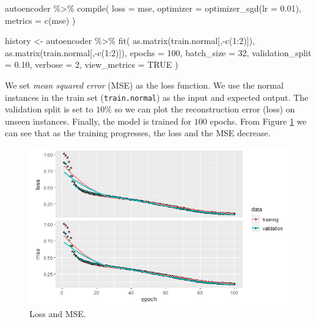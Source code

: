 \documentclass[
  11pt,
]{krantz}
\newenvironment{Shaded}{\begin{snugshade}}{\end{snugshade}}
\newcommand{\AttributeTok}[1]{\textcolor[rgb]{0.61,0.61,0.61}{#1}}
\newcommand{\ConstantTok}[1]{\textcolor[rgb]{0,0,0}{#1}}
\newcommand{\DecValTok}[1]{\textcolor[rgb]{0.06,0.06,0.06}{#1}}
\newcommand{\FloatTok}[1]{\textcolor[rgb]{0.06,0.06,0.06}{#1}}
\newcommand{\FunctionTok}[1]{\textcolor[rgb]{0,0,0}{#1}}
\newcommand{\NormalTok}[1]{#1}
\newcommand{\OtherTok}[1]{\textcolor[rgb]{0.37,0.37,0.37}{#1}}
\newcommand{\SpecialCharTok}[1]{\textcolor[rgb]{0,0,0}{#1}}
\newcommand{\StringTok}[1]{\textcolor[rgb]{0.5,0.5,0.5}{#1}}
\begin{document}
\begin{Shaded}
\begin{Highlighting}[]
\NormalTok{autoencoder }\SpecialCharTok{\%\textgreater{}\%} \FunctionTok{compile}\NormalTok{(}
  \AttributeTok{loss =} \StringTok{\textquotesingle{}mse\textquotesingle{}}\NormalTok{,}
  \AttributeTok{optimizer =} \FunctionTok{optimizer\_sgd}\NormalTok{(}\AttributeTok{lr =} \FloatTok{0.01}\NormalTok{),}
  \AttributeTok{metrics =} \FunctionTok{c}\NormalTok{(}\StringTok{\textquotesingle{}mse\textquotesingle{}}\NormalTok{)}
\NormalTok{)}

\NormalTok{history }\OtherTok{\textless{}{-}}\NormalTok{ autoencoder }\SpecialCharTok{\%\textgreater{}\%} \FunctionTok{fit}\NormalTok{(}
  \FunctionTok{as.matrix}\NormalTok{(train.normal[,}\SpecialCharTok{{-}}\FunctionTok{c}\NormalTok{(}\DecValTok{1}\SpecialCharTok{:}\DecValTok{2}\NormalTok{)]),}
  \FunctionTok{as.matrix}\NormalTok{(train.normal[,}\SpecialCharTok{{-}}\FunctionTok{c}\NormalTok{(}\DecValTok{1}\SpecialCharTok{:}\DecValTok{2}\NormalTok{)]),}
  \AttributeTok{epochs =} \DecValTok{100}\NormalTok{,}
  \AttributeTok{batch\_size =} \DecValTok{32}\NormalTok{,}
  \AttributeTok{validation\_split =} \FloatTok{0.10}\NormalTok{,}
  \AttributeTok{verbose =} \DecValTok{2}\NormalTok{,}
  \AttributeTok{view\_metrics =} \ConstantTok{TRUE}
\NormalTok{)}
\end{Highlighting}
\end{Shaded}

We set \emph{mean squared error} (MSE) as the loss function. We use the normal instances in the train set (\texttt{train.normal}) as the input and expected output. The validation split is set to \(10\%\) so we can plot the reconstruction error (loss) on unseen instances. Finally, the model is trained for \(100\) epochs. From Figure \ref{fig:lossAutoencoder} we can see that as the training progresses, the loss and the MSE decrease.

\begin{figure}

{\centering \includegraphics[width=0.9\linewidth]{images/loss_autoencoder} 

}

\caption{Loss and MSE.}\label{fig:lossAutoencoder}
\end{figure}
\end{document}
